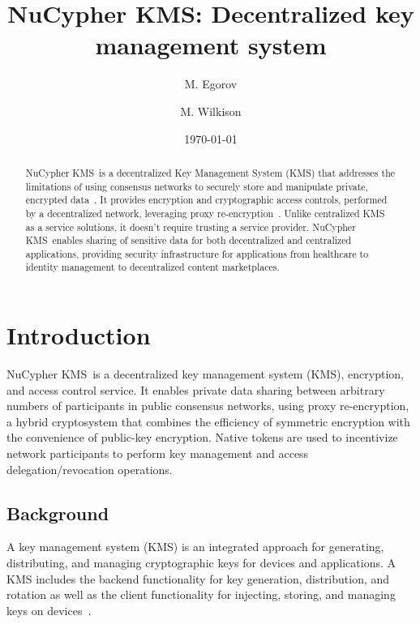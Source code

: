 \documentclass[notitlepage,longbibliography]{revtex4-1}
\newcommand{\kms}{NuCypher KMS}
\begin{document}
\title{\kms: Decentralized key management system}

\author{M. Egorov}
\author{M. Wilkison}


\begin{abstract}
    \kms~is a decentralized Key Management System (KMS) that addresses the limitations of using consensus
    networks to securely store and manipulate private, encrypted data~\cite{cryptoeprint:2017:201}.
    It provides encryption and cryptographic access controls, performed by a decentralized network,
    leveraging proxy re-encryption~\cite{wiki:pre}.
    Unlike centralized KMS as a service solutions, it doesn't require trusting a service provider.
    \kms~enables sharing of sensitive data for both decentralized and centralized applications,
    providing security infrastructure for applications from healthcare to identity management to decentralized content marketplaces.
\end{abstract}

\date{\today}
\maketitle

\newpage
\tableofcontents
\newpage

\section{Introduction}

\kms~is a decentralized key management system (KMS), encryption, and access control service.
It enables private data sharing between arbitrary numbers of participants in public consensus networks,
using proxy re-encryption, a hybrid cryptosystem that combines the efficiency of symmetric encryption with the convenience of public-key encryption.
Native tokens are used to incentivize network participants to perform key management and access delegation/revocation operations.

\subsection{Background}
A key management system (KMS) is an integrated approach for generating, distributing, and managing cryptographic keys for devices and
applications.
A KMS includes the backend functionality for key generation, distribution, and rotation as well as the client functionality for
injecting, storing, and managing keys on devices~\cite{wiki:kms}.
\end{document}

